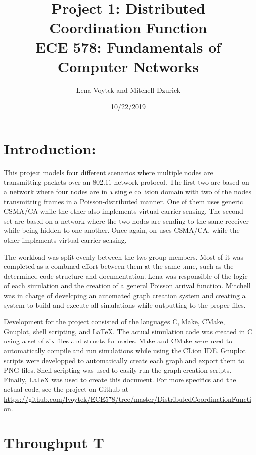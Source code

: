 \documentclass[11pt]{article}
\title {{\bf Project 1: Distributed Coordination Function} \\
\large{ECE 578: Fundamentals of Computer Networks}}
\author{Lena Voytek and Mitchell Dzurick}
\date{10/22/2019}
\begin{document}
\maketitle{}

\section*{Introduction:}

    This project models four different scenarios where multiple nodes are transmitting packets over an 802.11 network protocol. The first two are based on a network where four nodes are in a single collision domain with two of the nodes transmitting frames in a Poisson-distributed manner. One of them uses generic CSMA/CA while the other also implements virtual carrier sensing. The second set are based on a network where the two nodes are sending to the same receiver while being hidden to one another. Once again, on uses CSMA/CA, while the other implements virtual carrier sensing.
    \par
    The workload was split evenly between the two group members. Most of it was completed as a combined effort between them at the same time, such as the determined code structure and documentation. Lena was responsible of the logic of each simulation and the creation of a general Poisson arrival function. Mitchell was in charge of developing an automated graph creation system and creating a system to build and execute all simulations while outputting to the proper files.
    \par
    Development for the project consisted of the languages C, Make, CMake, Gnuplot, shell scripting, and \LaTeX{}. The actual simulation code was created in C using a set of six files and structs for nodes. Make and CMake were used to automatically compile and run simulations while using the CLion IDE. Gnuplot scripts were developped to automatically create each graph and export them to PNG files. Shell scripting was used to easily run the graph creation scripts. Finally, \LaTeX{} was used to create this document. For more specifics and the actual code, see the project on Github at \\
    \textcolor{blue}{ \href{https://github.com/lvoytek/ECE578/tree/master/DistributedCoordinationFunction}{https://github.com/lvoytek/ECE578/tree/master/DistributedCoordinationFunction}}.

\clearpage

\section{Throughput T}
\end{document}

